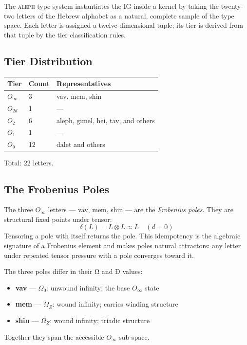 \documentclass[12pt,a4paper]{article}
\newcommand{\alephsys}{\textsc{aleph}}
\newcommand{\OTwo}{O₂}
\newcommand{\OZero}{O₀}
\newcommand{\OOne}{O₁}
\newcommand{\OTwod}{O_{2d}}
\begin{document}
The \alephsys{} type system instantiates the IG inside a kernel by taking the twenty-two letters of the Hebrew alphabet as a natural, complete sample of the type space. Each letter is assigned a twelve-dimensional tuple; its tier is derived from that tuple by the tier classification rules.

\subsection{Tier Distribution}

\begin{tabularx}{\linewidth}{l l l}
\toprule
\textbf{Tier} & \textbf{Count} & \textbf{Representatives} \\
\midrule
$O_\infty$ & 3  & vav, mem, shin \\
$\OTwod$   & 1  & — \\
$\OTwo$    & 6  & aleph, gimel, hei, tav, and others \\
$\OOne$    & 1  & — \\
$\OZero$   & 12 & dalet and others \\
\bottomrule
\end{tabularx}

Total: 22 letters.

\subsection{The Frobenius Poles}

The three $O_\infty$ letters — vav, mem, shin — are the \emph{Frobenius poles}. They are structural fixed points under tensor:
\[
    \delta(L) = L \otimes L \approx L \quad (d = 0)
\]
Tensoring a pole with itself returns the pole. This idempotency is the algebraic signature of a Frobenius element and makes poles natural attractors: any letter under repeated tensor pressure with a pole converges toward it.

The three poles differ in their Ω and Ð values:
\begin{itemize}
    \item \textbf{vav} --- $\Omega_0$: unwound infinity; the base $O_\infty$ state
    \item \textbf{mem} --- $\Omega_Z$: wound infinity; carries winding structure
    \item \textbf{shin} --- $\Omega_Z$: wound infinity; triadic structure
\end{itemize}

Together they span the accessible $O_\infty$ sub-space.
\end{document}
